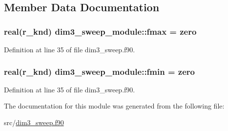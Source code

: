 \subsection{Member Data Documentation}
\hypertarget{classdim3__sweep__module_aac295110595a9c85602d58906d51cd46}{
\subsubsection[{fmax}]{\setlength{\rightskip}{0pt plus 5cm}real(r\-\_\-knd) dim3\-\_\-sweep\-\_\-module\-::fmax = zero}}\label{classdim3__sweep__module_aac295110595a9c85602d58906d51cd46}


Definition at line 35 of file dim3\-\_\-sweep.\-f90.

\hypertarget{classdim3__sweep__module_a5ec448e8a99070a51d62e75a430a9c60}{
\subsubsection[{fmin}]{\setlength{\rightskip}{0pt plus 5cm}real(r\-\_\-knd) dim3\-\_\-sweep\-\_\-module\-::fmin = zero}}\label{classdim3__sweep__module_a5ec448e8a99070a51d62e75a430a9c60}


Definition at line 35 of file dim3\-\_\-sweep.\-f90.



The documentation for this module was generated from the following file\-:\begin{DoxyCompactItemize}
\item 
src/\hyperlink{dim3__sweep_8f90}{dim3\-\_\-sweep.\-f90}\end{DoxyCompactItemize}

